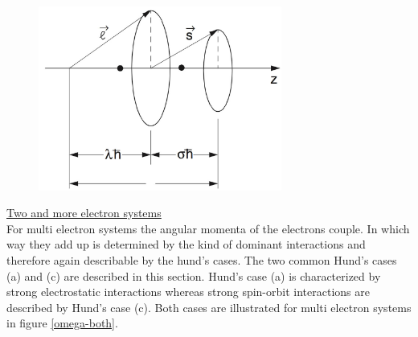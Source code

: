 \documentclass[parskip,12pt,headsepline,a4paper] {scrbook}
\begin{document}
\begin{figure}[ht]
\centerline{
\includegraphics[width=8cm]{./spectroscopy/ls-mol.jpg}}
\end{figure}

\underline{Two and more electron systems} \\
For multi electron systems the angular momenta of the electrons couple. In which way they add up is determined by the kind of dominant interactions and therefore again describable by the hund's cases. The two common Hund's cases (a) and (c) are described in this section. Hund's case (a) is characterized by strong electrostatic interactions whereas strong spin-orbit interactions are described by Hund's case (c). Both cases are illustrated for multi electron systems in figure \ref{omega-both}.
\end{document}
